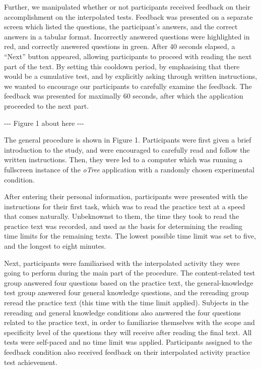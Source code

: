 Further, we manipulated whether or not participants 
received feedback on their accomplishment on the 
interpolated tests. Feedback was presented on a separate 
screen which listed the questions, the participant's
answers, and the correct answers in a tabular format. 
Incorrectly answered questions were highlighted in red, and 
correctly answered questions in green. After 40 seconds 
elapsed, a ``Next'' button appeared, allowing participants 
to proceed with reading the next part of the text. By 
setting this cooldown period, by emphasising that there
would be a cumulative test, and by explicitly asking 
through written instructions, we wanted to encourage our 
participants to carefully examine the feedback. The 
feedback was presented for maximally 60 seconds, after 
which the application proceeded to the next part.


\begin{center}
    -{}-{}- Figure 1 about here -{}-{}-
\end{center}

The general procedure is shown in Figure 1. Participants
were first given a brief introduction to the study, and 
were encouraged to carefully read and follow the written 
instructions. Then, they were led to a computer which was 
running a fullscreen instance of the \textit{oTree} 
application with a randomly chosen experimental
condition.

After entering their personal information, participants 
were presented with the instructions for their first task, 
which was to read the practice text at a speed that comes 
naturally. Unbeknownst to them, the time they took to read 
the practice text was recorded, and used as the basis for 
determining the reading time limits for the remaining 
texts. The lowest possible time limit was set to five, and 
the longest to eight minutes.

Next, participants were familiarised with the interpolated 
activity they were going to perform during the main part of 
the procedure. The content-related test group answered four 
questions based on the practice text, the general-knowledge 
test group answered four general knowledge questions, and 
the rereading group reread the practice text (this time
with the time limit applied). Subjects in the rereading and 
general knowledge conditions also answered the four 
questions related to the practice text, in order to 
familiarise themselves with the scope and specificity level 
of the questions they will receive after reading the final 
text. All tests were self-paced and no time limit was 
applied. Participants assigned to the feedback condition 
also received feedback on their interpolated activity 
practice test achievement.

